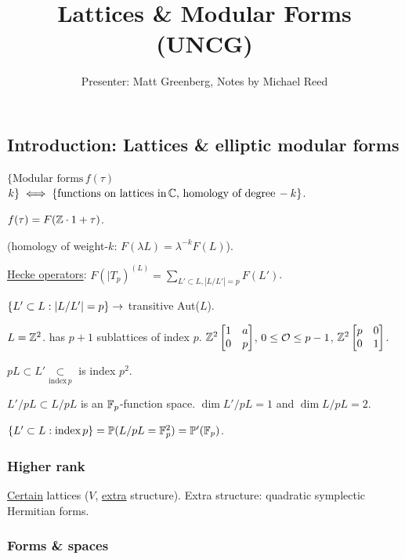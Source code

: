 \documentclass[]{article}
\title{Lattices \& Modular Forms (UNCG)}
\author{Presenter: Matt Greenberg, Notes by Michael Reed}
\begin{document}
\maketitle


\subsection*{Introduction: Lattices \& elliptic modular forms}

$\{\text{Modular forms}\,f(\tau)$ \,\, $k\} \iff \{ \text{functions on lattices in} \, \mathbb{C},\,\text{homology of degree}\, -k\}$.

$f(\tau) = F(\mathbb{Z}\cdot 1 + \mathbb{\tau})$.

(homology of weight-$k$: $F(\lambda L) = \lambda^{-k} F(L)$).

\ul{Hecke operators}: $\displaystyle F(\mid T_p)^{(L)} = \sum_{L'\subset L,|L/L'| = p} F(L')$.

$\{L'\subset L: |L/L'| = p\} \rightarrow$ transitive Aut($L$).

\begin{example}
	$L = \mathbb{Z}^2$. has $p+1$ sublattices of index $p$. $\mathbb{Z}^2 \begin{bmatrix}1&a\\0&p\end{bmatrix}$, $0\leq \mathcal{O} \leq p-1$, $\mathbb{Z}^2 \begin{bmatrix}p&0\\0&1\end{bmatrix}$.
\end{example}

$pL \subset L' \underset{\text{index}\,p}{\subset}$ is index $p^2$.

$L'/pL\subset L/pL$ is an $\mathbb{F}_p$-function space. $\dim L'/pL = 1$ and $\dim L/pL = 2$.

$\{L'\subset L: \text{index}\,p\} = \mathbb{P}(L/pL = \mathbb{F}_p^2) = \mathbb{P}'(\mathbb{F}_p)$.

\subsubsection*{Higher rank}

\ul{Certain} lattices ($V$, \ul{extra} structure). Extra structure: quadratic symplectic Hermitian forms.

\subsubsection*{Forms \& spaces}
\end{document}

